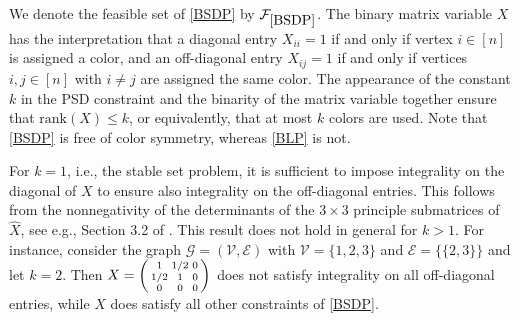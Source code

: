 \documentclass[11pt, a4paper]{article}
\newcommand{\rank}[1]{{\text{rank}\left(#1\right)}}
\newcommand{\mc}{\mathcal}
\newcommand{\aug}[1]{\hat{#1}}
\begin{document}
We denote the feasible set of \eqref{BSDP} by $\mc{F}_{\eqref{BSDP}}$.
The binary matrix variable $X$ has the interpretation that a diagonal entry $X_{ii} = 1$ if and only if vertex $i \in [n]$ is assigned a color, and an off-diagonal entry $X_{ij} = 1$ if and only if vertices $i, j \in [n]$ with $i \neq j$ are assigned the same color. 
The appearance of the constant $k$ in the PSD constraint and the binarity of the matrix variable together ensure that $\rank{X} \leq k$, or equivalently, that at most $k$ colors are used.
Note that \eqref{BSDP} is free of color symmetry, whereas \eqref{BLP} is not.

For $k = 1$, i.e., the stable set problem, it is sufficient to impose integrality on the diagonal of $X$ to ensure also integrality on the off-diagonal entries. 
This follows from the nonnegativity of the determinants of the $3\times 3$ principle submatrices of $\aug{X}$, see e.g., Section 3.2 of \cite{Helmberg2000SDPForCO}.
This result does not hold in general for $k>1$.
For instance, consider the graph $\mc{G} = (\mc{V}, \mc{E})$ with $\mc{V} = \{1,2,3\}$ and $\mc{E} = \{\{2,3\}\}$ and let $k=2$. Then $X = \begin{psmallmatrix} 1 & 1/2 & 0\\ 1/2 & 1 & 0 \\ 0 & 0 & 0\end{psmallmatrix}$ does not satisfy integrality on all off-diagonal entries, while $X$ does satisfy all other constraints of \eqref{BSDP}.
\end{document}
